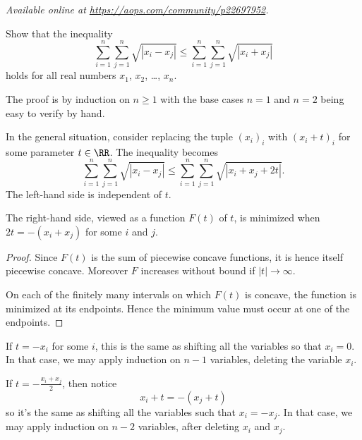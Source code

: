 \textsl{Available online at \url{https://aops.com/community/p22697952}.}
\begin{mdframed}[style=mdpurplebox,frametitle={Problem statement}]
Show that the inequality
\[\sum_{i=1}^n \sum_{j=1}^n \sqrt{|x_i-x_j|}
  \le \sum_{i=1}^n \sum_{j=1}^n \sqrt{|x_i+x_j|} \]
holds for all real numbers $x_1$, $x_2$, \dots, $x_n$.
\end{mdframed}
The proof is by induction on $n \ge 1$ with the base cases $n=1$ and
$n=2$ being easy to verify by hand.

In the general situation, consider replacing the tuple $(x_i)_i$
with $(x_i+t)_i$ for some parameter $t \in \RR$.
The inequality becomes
\[\sum_{i=1}^n \sum_{j=1}^n \sqrt{|x_i-x_j|}
  \le \sum_{i=1}^n \sum_{j=1}^n \sqrt{|x_i+x_j+2t|}. \]
The left-hand side is independent of $t$.
\begin{claim*}
  The right-hand side, viewed as a function $F(t)$ of $t$,
  is minimized when $2t = -(x_i + x_j)$ for some $i$ and $j$.
\end{claim*}
\begin{proof}
  Since $F(t)$ is the sum of piecewise concave functions,
  it is hence itself piecewise concave.
  Moreover $F$ increases without bound if $|t| \to \infty$.

  On each of the finitely many intervals on which $F(t)$ is
  concave, the function is minimized at its endpoints.
  Hence the minimum value must occur at one of the endpoints.
\end{proof}

If $t = -x_i$ for some $i$, this is the same as shifting all the
variables so that $x_i = 0$.
In that case, we may apply induction on $n-1$ variables,
deleting the variable $x_i$.

If $t = -\frac{x_i+x_j}{2}$, then notice
\[ x_i + t = -(x_j + t) \]
so it's the same as shifting all the variables such that $x_i = -x_j$.
In that case, we may apply induction on $n-2$ variables,
after deleting $x_i$ and $x_j$.
\pagebreak